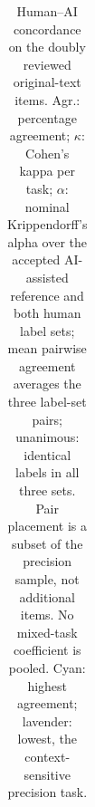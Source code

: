 \begin{table}[t]
\begin{tabular}{@{}lrcccccccccc@{}}
\bottomrule
\end{tabular}
\caption{Human--AI concordance on the  doubly reviewed original-text items.
Agr.: percentage agreement; $\kappa$: Cohen's kappa per task; $\alpha$: nominal
Krippendorff's alpha over the accepted AI-assisted reference and both human label sets;
mean pairwise agreement averages the three label-set pairs; unanimous: identical labels in
all three sets. Pair placement is a subset of the precision sample, not additional items.
No mixed-task coefficient is pooled. Cyan: highest agreement; lavender: lowest, the
context-sensitive precision task.}
\label{tab:human-agreement}\label{tab:human-ai-agreement}\label{tab:human-alpha}
\end{table}
